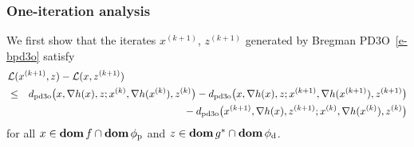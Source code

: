 \documentclass[letterpaper,11pt]{article}
\newcommand{\BEA}{\begin{eqnarray}}
\newcommand{\EEA}{\end{eqnarray}}
\newcommand{\dom}{\mathop{\bf dom}}
\newcommand{\primal}{\mathrm p}
\newcommand{\dual}{\mathrm d}
\newcommand{\cL}{\mathcal L}
\begin{document}
\subsubsection{One-iteration analysis}

We first show that the iterates $x^{(k+1)}$, $z^{(k+1)}$ generated by
Bregman PD3O~\eqref{e-bpd3o} satisfy
\BEA
\lefteqn{\cL(x^{(k+1)},z)-\cL(x,z^{(k+1)})} \nonumber \\
&\leq & d_\mathrm{pd3o}
  \big(x,\nabla h(x), z;x^{(k)},\nabla h(x^{(k)}),z^{(k)}\big)
  -d_\mathrm{pd3o} \big(
    x,\nabla h(x), z;x^{(k+1)},\nabla h(x^{(k+1)}),z^{(k+1)}
  \big) \nonumber \\
& &\mbox{} -d_\mathrm{pd3o}\big(x^{(k+1)},\nabla h(x), z^{(k+1)};%
    x^{(k)},\nabla h(x^{(k)}),z^{(k)} \big) \label{e-bpd3o-conv-i}
\EEA
for all $x \in \dom f \cap \dom \phi_\primal$ and
$z \in \dom g^\ast \cap \dom \phi_\dual$.
\end{document}
